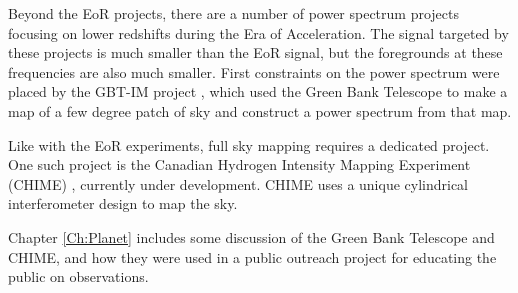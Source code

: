 Beyond the EoR projects, there are a number of power spectrum projects focusing on lower redshifts during the Era of Acceleration. The \cm signal targeted by these projects is much smaller than the EoR signal, but the foregrounds at these frequencies are also much smaller. First constraints on the power spectrum were placed by the GBT-IM project \cite{masui_2012}\cite{switzer_2013}, which used the Green Bank Telescope to make a map of a few degree patch of sky and construct a power spectrum from that map. 

Like with the EoR experiments, full sky mapping requires a dedicated project. One such project is the Canadian Hydrogen Intensity Mapping Experiment (CHIME) \cite{shaw_2014}\cite{chime}, currently under development. CHIME uses a unique cylindrical interferometer design to map the sky. 

Chapter \ref{Ch:Planet} includes some discussion of the Green Bank Telescope and CHIME, and how they were used in a public outreach project for educating the public on \cm observations. 

